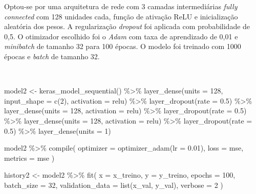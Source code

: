\documentclass[
  a4paperpaper,
]{article}
\newenvironment{Shaded}{\begin{snugshade}}{\end{snugshade}}
\newcommand{\AttributeTok}[1]{\textcolor[rgb]{0.40,0.45,0.13}{#1}}
\newcommand{\DecValTok}[1]{\textcolor[rgb]{0.68,0.00,0.00}{#1}}
\newcommand{\FloatTok}[1]{\textcolor[rgb]{0.68,0.00,0.00}{#1}}
\newcommand{\FunctionTok}[1]{\textcolor[rgb]{0.28,0.35,0.67}{#1}}
\newcommand{\NormalTok}[1]{\textcolor[rgb]{0.00,0.23,0.31}{#1}}
\newcommand{\OtherTok}[1]{\textcolor[rgb]{0.00,0.23,0.31}{#1}}
\newcommand{\SpecialCharTok}[1]{\textcolor[rgb]{0.37,0.37,0.37}{#1}}
\newcommand{\StringTok}[1]{\textcolor[rgb]{0.13,0.47,0.30}{#1}}
\begin{document}
Optou-se por uma arquitetura de rede com 3 camadas intermediárias
\emph{fully connected} com 128 unidades cada, função de ativação ReLU e
inicialização aleatória dos pesos. A regularização \emph{dropout} foi
aplicada com probabilidade de 0,5. O otimizador escolhido foi o
\emph{Adam} com taxa de aprendizado de 0,01 e \emph{minibatch} de
tamanho 32 para 100 épocas. O modelo foi treinado com 1000 épocas e
\emph{batch} de tamanho 32.

~

\begin{Shaded}
\begin{Highlighting}[]
\NormalTok{model2 }\OtherTok{\textless{}{-}} \FunctionTok{keras\_model\_sequential}\NormalTok{() }\SpecialCharTok{\%\textgreater{}\%}
  \FunctionTok{layer\_dense}\NormalTok{(}\AttributeTok{units =} \DecValTok{128}\NormalTok{, }\AttributeTok{input\_shape =} \FunctionTok{c}\NormalTok{(}\DecValTok{2}\NormalTok{), }\AttributeTok{activation =} \StringTok{\textquotesingle{}relu\textquotesingle{}}\NormalTok{) }\SpecialCharTok{\%\textgreater{}\%}
  \FunctionTok{layer\_dropout}\NormalTok{(}\AttributeTok{rate =} \FloatTok{0.5}\NormalTok{) }\SpecialCharTok{\%\textgreater{}\%}  
  \FunctionTok{layer\_dense}\NormalTok{(}\AttributeTok{units =} \DecValTok{128}\NormalTok{, }\AttributeTok{activation =} \StringTok{\textquotesingle{}relu\textquotesingle{}}\NormalTok{) }\SpecialCharTok{\%\textgreater{}\%}
  \FunctionTok{layer\_dropout}\NormalTok{(}\AttributeTok{rate =} \FloatTok{0.5}\NormalTok{) }\SpecialCharTok{\%\textgreater{}\%}  
  \FunctionTok{layer\_dense}\NormalTok{(}\AttributeTok{units =} \DecValTok{128}\NormalTok{, }\AttributeTok{activation =} \StringTok{\textquotesingle{}relu\textquotesingle{}}\NormalTok{) }\SpecialCharTok{\%\textgreater{}\%}
  \FunctionTok{layer\_dropout}\NormalTok{(}\AttributeTok{rate =} \FloatTok{0.5}\NormalTok{) }\SpecialCharTok{\%\textgreater{}\%}  
  \FunctionTok{layer\_dense}\NormalTok{(}\AttributeTok{units =} \DecValTok{1}\NormalTok{)  }

\NormalTok{model2 }\SpecialCharTok{\%\textgreater{}\%} \FunctionTok{compile}\NormalTok{(}
  \AttributeTok{optimizer =} \FunctionTok{optimizer\_adam}\NormalTok{(}\AttributeTok{lr =} \FloatTok{0.01}\NormalTok{),  }
  \AttributeTok{loss =} \StringTok{\textquotesingle{}mse\textquotesingle{}}\NormalTok{,}
  \AttributeTok{metrics =} \StringTok{\textquotesingle{}mse\textquotesingle{}}
\NormalTok{)}

\NormalTok{history2 }\OtherTok{\textless{}{-}}\NormalTok{ model2 }\SpecialCharTok{\%\textgreater{}\%} \FunctionTok{fit}\NormalTok{(}
  \AttributeTok{x =}\NormalTok{ x\_treino,}
  \AttributeTok{y =}\NormalTok{ y\_treino,}
  \AttributeTok{epochs =} \DecValTok{100}\NormalTok{,          }
  \AttributeTok{batch\_size =} \DecValTok{32}\NormalTok{,       }
  \AttributeTok{validation\_data =} \FunctionTok{list}\NormalTok{(x\_val, y\_val),  }
  \AttributeTok{verbose =} \DecValTok{2}
\NormalTok{)}
\end{Highlighting}
\end{Shaded}
\end{document}
